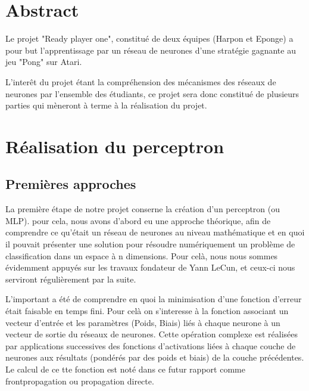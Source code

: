 \documentclass[
    10pt,
    a4paper,
    oneside,
    headinclude,footinclude,
    BCOR=5mm,
    captions=tableabove
]{scrartcl}
\title{\normalfont{\spacedallcaps{Ready-Player-One}}}
\subtitle{Rapport du groupe Harpon}
\author{Martin Lehoux, Pierre Biret \and Sacha Seksik, Loïc Audoin}
\date{\today}
\begin{document}
    
\renewcommand{\sectionmark}[1]{\markright{\spacedlowsmallcaps{#1}}}
\lehead{\mbox{\llap{\small\thepage\kern1em\color{halfgray} \vline}\color{halfgray}\hspace{0.5em}\rightmark\hfil}}
\pagestyle{scrheadings}

\maketitle
\tableofcontents

\newpage
\section*{Abstract}
Le projet "Ready player one", constitué de deux équipes (Harpon et Eponge) a pour but l'apprentissage par un réseau de neurones d'une stratégie gagnante au jeu "Pong" sur Atari.

L'interêt du projet étant la compréhension des mécanismes des réseaux de neurones par l'ensemble des étudiants, ce projet sera donc constitué de plusieurs parties qui mèneront à terme à la réalisation du projet.		

\newpage
\section{Réalisation du perceptron}

\subsection{Premières approches}

La première étape de notre projet conserne la création d'un perceptron (ou MLP). pour cela, nous avons d'abord eu une approche théorique, afin de comprendre ce qu'était un réseau de neurones au niveau mathématique et en quoi il pouvait présenter une solution pour résoudre numériquement un problème de classification dans un espace à n dimensions. Pour celà, nous nous sommes évidemment appuyés sur les travaux fondateur de Yann LeCun, et ceux-ci nous serviront régulièrement par la suite. 

L'important a été de comprendre en quoi la minimisation d'une fonction d'erreur était faisable en temps fini. Pour celà on s'interesse à la fonction associant un vecteur d'entrée et les paramètres (Poids, Biais) liés à chaque neurone à un vecteur de sortie du réseaux de neurones. Cette opération complexe est réalisées par applications successives des fonctions d'activations liées à chaque couche de neurones aux résultats (pondérés par des poids et biais) de la couche précédentes. 
Le calcul de ce tte fonction est noté dans ce futur rapport comme frontpropagation ou propagation directe.
\end{document}
